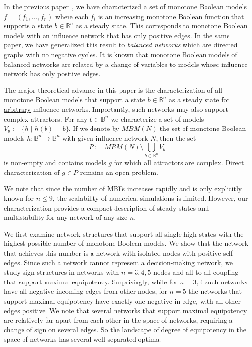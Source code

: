 \documentclass[12pt]{amsart}
\newcommand{\bbB}{\mathbb{B}}
\theoremstyle{definition}
\begin{document}
In the previous paper~\cite{adigwe_characterization_2026}, we have characterized a set of monotone Boolean models $f=(f_1, \ldots, f_n)$ where each $f_i$ is an increasing monotone Boolean function that supports a state $b\in \bbB^n$ as a steady state. This corresponds to monotone Boolean models with an influence network that has only positive edges. In the same paper, we have generalized this result to \textit{balanced networks} which are directed graphs with no negative cycles. It is known that monotone Boolean models of balanced networks are related by a change of variables to models whose influence network has only positive edges. 



The major theoretical advance in this paper is the characterization of all monotone Boolean models that support a state $b\in \bbB^n$ as a steady state for \underline{arbitrary} influence networks. Importantly, such networks may also support complex attractors. For any $b \in \bbB^n$ we characterize a set of models $V_b:=\{ h \;|\; h(b)=b \}$. If we denote by $MBM(N)$ the set of monotone Boolean models $h:\bbB^n \to \bbB^n$ with given influence network $N$, then the set 
\[ P:= MBM(N) \setminus \bigcup_{b\in \bbB^n} V_b\]
is non-empty and contains models $g$ for which all attractors are complex. Direct characterization of $g\in P$ remains an open problem. 

We note that since the number of MBFs increases rapidly and is only explicitly known for $n \leq 9$, the scalability of numerical simulations is limited. However, our characterization provides a compact description of steady states and multistability for any network of any size $n$.


We first examine network structures that support all single high states with the highest possible number of monotone Boolean models. We show that the network that achieves this number is a network with isolated nodes with positive self-edges. Since such a network cannot represent a decision-making network, we study sign structures in networks with $n=3,4,5$ nodes and all-to-all coupling that support maximal equipotency. Surprisingly, while for $n=3,4$ such networks have all negative incoming edges from other nodes, for $n=5$ the networks that support maximal equipotency have exactly one negative in-edge, with all other edges positive.
We note that several networks that support maximal equipotency are relatively far apart from each other in the space of networks, requiring a change of sign on several edges. So the landscape of degree of equipotency in the space of networks has several well-separated optima.
\end{document}
